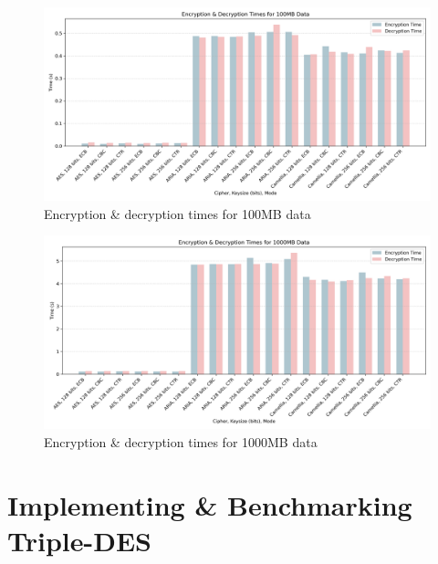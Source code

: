 \documentclass[a4paper]{article}
\begin{document}
\begin{figure}[H]
    \centering
    \includegraphics[width=\textwidth]{./images/100mb.png}
    \caption{Encryption \& decryption times for 100MB data}
\end{figure}

\begin{figure}[H]
    \centering
    \includegraphics[width=\textwidth]{./images/1000mb.png}
    \caption{Encryption \& decryption times for 1000MB data}
\end{figure}


\section{Implementing \& Benchmarking Triple-DES}
\end{document}
